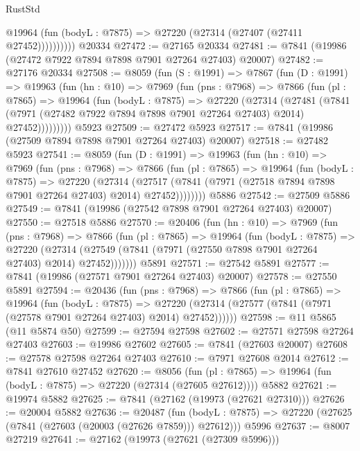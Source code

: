 \begin{lexlean}{RustStd}
\begin{coremodule}
{\begin{coremodule}
{{{{{{{{{{{{{{{{{{{{{{{{{{{{{{{{{{{{{{{{{{{{{{{{{{{{{{              @19964 (fun (bodyL : @7875) => @27220 (@27314 (@27407 (@27411 @27452))))))))))
    @20334
@27472 := @27165 @20334
@27481 := @7841 (@19986 (@27472 @7922 @7894 @7898 @7901 @27264 @27403) @20007)
@27482 := @27176 @20334
@27508 := @8059
    (fun (S : @1991) =>
    @7867
      (fun (D : @1991) =>
      @19963
        (fun (hn : @10) =>
        @7969
          (fun (pns : @7968) =>
          @7866
            (fun (pl : @7865) =>
            @19964
              (fun (bodyL : @7875) =>
              @27220
                (@27314
                  (@27481
                    (@7841
                      (@7971 (@27482 @7922 @7894 @7898 @7901 @27264 @27403) @2014)
                      @27452)))))))))
    @5923
@27509 := @27472 @5923
@27517 := @7841 (@19986 (@27509 @7894 @7898 @7901 @27264 @27403) @20007)
@27518 := @27482 @5923
@27541 := @8059
    (fun (D : @1991) =>
    @19963
      (fun (hn : @10) =>
      @7969
        (fun (pns : @7968) =>
        @7866
          (fun (pl : @7865) =>
          @19964
            (fun (bodyL : @7875) =>
            @27220
              (@27314
                (@27517 (@7841 (@7971 (@27518 @7894 @7898 @7901 @27264 @27403) @2014) @27452))))))))
    @5886
@27542 := @27509 @5886
@27549 := @7841 (@19986 (@27542 @7898 @7901 @27264 @27403) @20007)
@27550 := @27518 @5886
@27570 := @20406
    (fun (hn : @10) =>
    @7969
      (fun (pns : @7968) =>
      @7866
        (fun (pl : @7865) =>
        @19964
          (fun (bodyL : @7875) =>
          @27220
            (@27314 (@27549 (@7841 (@7971 (@27550 @7898 @7901 @27264 @27403) @2014) @27452)))))))
    @5891
@27571 := @27542 @5891
@27577 := @7841 (@19986 (@27571 @7901 @27264 @27403) @20007)
@27578 := @27550 @5891
@27594 := @20436
    (fun (pns : @7968) =>
    @7866
      (fun (pl : @7865) =>
      @19964
        (fun (bodyL : @7875) =>
        @27220 (@27314 (@27577 (@7841 (@7971 (@27578 @7901 @27264 @27403) @2014) @27452))))))
@27598 := @11 @5865 (@11 @5874 @50)
@27599 := @27594 @27598
@27602 := @27571 @27598 @27264 @27403
@27603 := @19986 @27602
@27605 := @7841 (@27603 @20007)
@27608 := @27578 @27598 @27264 @27403
@27610 := @7971 @27608 @2014
@27612 := @7841 @27610 @27452
@27620 := @8056
    (fun (pl : @7865) => @19964 (fun (bodyL : @7875) => @27220 (@27314 (@27605 @27612))))
    @5882
@27621 := @19974 @5882
@27625 := @7841 (@27162 (@19973 (@27621 @27310)))
@27626 := @20004 @5882
@27636 := @20487
    (fun (bodyL : @7875) => @27220 (@27625 (@7841 (@27603 (@20003 (@27626 @7859))) @27612)))
    @5996
@27637 := @8007 @27219
@27641 := @27162 (@19973 (@27621 (@27309 @5996)))
}}}}}}}}}}}}}}}}}}}}}}}}}}}}}}}}}}}}}}}}}}}}}}}}}}}}}}
\end{coremodule}}
\end{coremodule}
\end{lexlean}
